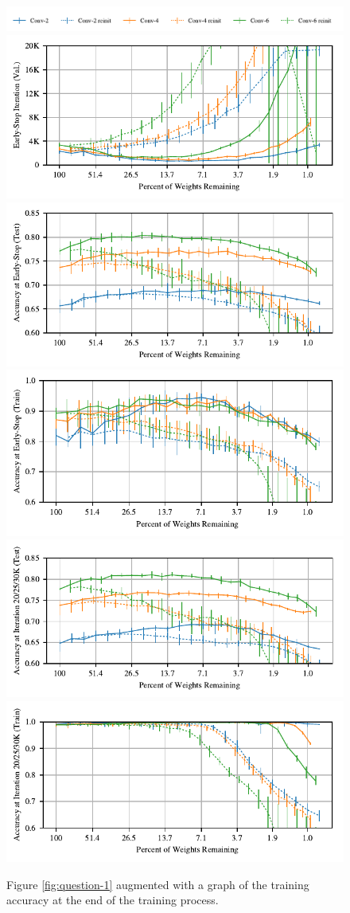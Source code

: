 \begin{figure}
\centering
\includegraphics[width=.8\textwidth]{graphs/cifar10/conv/conv_paperall_w/legend}
\includegraphics[width=.5\textwidth]{graphs/cifar10/conv/conv_paperall_w/iteration}%
\includegraphics[width=.5\textwidth]{graphs/cifar10/conv/conv_paperall_w/accuracy}
\hspace*{.5\textwidth}
\includegraphics[width=.5\textwidth]{graphs/cifar10/conv/conv_paperall_w/train_accuracy}
\includegraphics[width=.5\textwidth]{graphs/cifar10/conv/conv_paperall_w_last_iteration/accuracy}%
\includegraphics[width=.5\textwidth]{graphs/cifar10/conv/conv_paperall_w_last_iteration/train_accuracy}
\caption{Figure \ref{fig:question-1} augmented with a graph of the training accuracy at the end of the training process.}
\label{fig:question-12}
\end{figure}